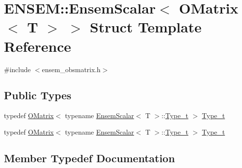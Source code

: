 \hypertarget{structENSEM_1_1EnsemScalar_3_01OMatrix_3_01T_01_4_01_4}{}\section{E\+N\+S\+EM\+:\+:Ensem\+Scalar$<$ O\+Matrix$<$ T $>$ $>$ Struct Template Reference}
\label{structENSEM_1_1EnsemScalar_3_01OMatrix_3_01T_01_4_01_4}


{\ttfamily \#include $<$ensem\+\_\+obsmatrix.\+h$>$}

\subsection*{Public Types}
\begin{DoxyCompactItemize}
\item 
typedef \mbox{\hyperlink{classENSEM_1_1OMatrix}{O\+Matrix}}$<$ typename \mbox{\hyperlink{structENSEM_1_1EnsemScalar}{Ensem\+Scalar}}$<$ T $>$\+::\mbox{\hyperlink{structENSEM_1_1EnsemScalar_3_01OMatrix_3_01T_01_4_01_4_ae82c62e546f488affe11e2bd214d3279}{Type\+\_\+t}} $>$ \mbox{\hyperlink{structENSEM_1_1EnsemScalar_3_01OMatrix_3_01T_01_4_01_4_ae82c62e546f488affe11e2bd214d3279}{Type\+\_\+t}}
\item 
typedef \mbox{\hyperlink{classENSEM_1_1OMatrix}{O\+Matrix}}$<$ typename \mbox{\hyperlink{structENSEM_1_1EnsemScalar}{Ensem\+Scalar}}$<$ T $>$\+::\mbox{\hyperlink{structENSEM_1_1EnsemScalar_3_01OMatrix_3_01T_01_4_01_4_ae82c62e546f488affe11e2bd214d3279}{Type\+\_\+t}} $>$ \mbox{\hyperlink{structENSEM_1_1EnsemScalar_3_01OMatrix_3_01T_01_4_01_4_ae82c62e546f488affe11e2bd214d3279}{Type\+\_\+t}}
\end{DoxyCompactItemize}


\subsection{Member Typedef Documentation}
\mbox{\label{structENSEM_1_1EnsemScalar_3_01OMatrix_3_01T_01_4_01_4_ae82c62e546f488affe11e2bd214d3279}} 
